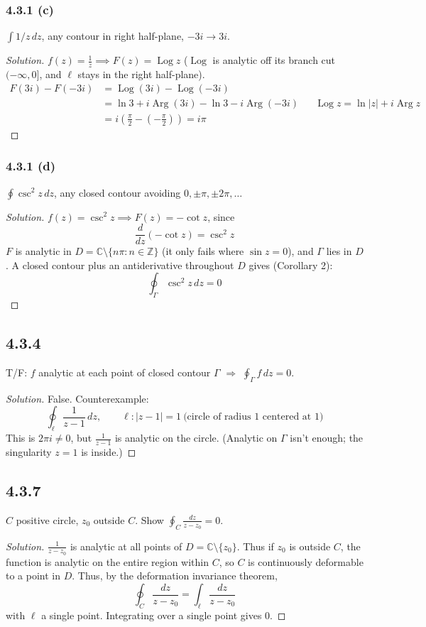 \documentclass{article}
\newenvironment{solution}{
\begin{proof}[Solution]}{
\end{proof}}
\begin{document}
\subsubsection*{4.3.1 (c)}
$\int 1/z\,dz$, any contour in right half-plane, $-3i \to 3i$.
\begin{solution}
  $f(z) = \frac{1}{z} \implies F(z) = \operatorname{Log} z$
  ($\operatorname{Log}$ is analytic off its branch cut $(-\infty, 0]$, and $\ell$ stays in
  the right half-plane).
  \begin{align*}
    F(3i) - F(-3i)
    & = \operatorname{Log}(3i) - \operatorname{Log}(-3i) \\
    & = \ln 3 + i\operatorname{Arg}(3i) - \ln 3 - i\operatorname{Arg}(-3i)
      && \operatorname{Log} z = \ln|z| + i\operatorname{Arg} z \\
    & = i\left(\frac{\pi}{2} - \left(-\frac{\pi}{2}\right)\right) = i\pi
  \end{align*}
\end{solution}

\subsubsection*{4.3.1 (d)}
$\oint \csc^2 z\,dz$, any closed contour avoiding $0, \pm\pi, \pm 2\pi, \dots$
\begin{solution}
  $f(z) = \csc^2 z \implies F(z) = -\cot z$, since
  \[
    \frac{d}{dz}(-\cot z) = \csc^2 z
  \]
  $F$ is analytic in $D = \mathbb{C} \setminus \{n\pi : n \in \mathbb{Z}\}$ (it only fails
  where $\sin z = 0$), and $\Gamma$ lies in $D$.
  A closed contour plus an antiderivative throughout $D$ gives (Corollary 2):
  \[
    \oint_\Gamma \csc^2 z\,dz = 0
  \]
\end{solution}

\subsection*{4.3.4}
T/F: $f$ analytic at each point of closed contour $\Gamma$ $\Rightarrow$ $\oint_\Gamma f\,dz = 0$.
\begin{solution}
  False. Counterexample:
  \[
    \oint_\ell \frac{1}{z-1}\,dz, \qquad \ell: |z-1| = 1 \ \text{(circle of radius 1 centered at 1)}
  \]
  This is $2\pi i \neq 0$, but $\frac{1}{z-1}$ is analytic on the circle. (Analytic on
  $\Gamma$ isn't enough; the singularity $z=1$ is inside.)
\end{solution}

\subsection*{4.3.7}
$C$ positive circle, $z_0$ outside $C$. Show $\oint_C \frac{dz}{z - z_0} = 0$.
\begin{solution}
  $\frac{1}{z - z_0}$ is analytic at all points of $D = \mathbb{C} \setminus \{z_0\}$.
  Thus if $z_0$ is outside $C$, the function is analytic on the entire region within $C$,
  so $C$ is continuously deformable to a point in $D$.
  Thus, by the deformation invariance theorem,
  \[
    \oint_C \frac{dz}{z-z_0} = \int_\ell \frac{dz}{z-z_0}
  \]
  with $\ell$ a single point. Integrating over a single point gives $0$.
\end{solution}
\end{document}
